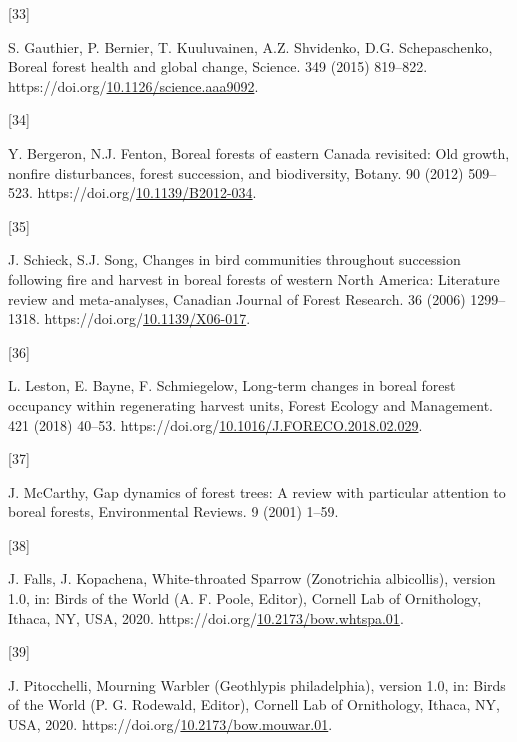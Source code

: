 \documentclass[manuscript, 3p, authoryear]{elsarticle} %
\newlength{\cslhangindent}
\newlength{\csllabelwidth}
\newlength{\cslentryspacingunit} %
\newenvironment{CSLReferences}[2] %
 {%
  \setlength{\parindent}{0pt}
  \ifodd #1
  \let\oldpar\par
  \def\par{\hangindent=\cslhangindent\oldpar}
  \fi
  \setlength{\parskip}{#2\cslentryspacingunit}
 }%
 {}
\newcommand{\CSLLeftMargin}[1]{\parbox[t]{\csllabelwidth}{#1}}
\newcommand{\CSLRightInline}[1]{\parbox[t]{\linewidth - \csllabelwidth}{#1}\break}
\begin{document}
\begin{CSLReferences}{0}{0}
\leavevmode{}%
\CSLLeftMargin{{[}33{]} }%
\CSLRightInline{S. Gauthier, P. Bernier, T. Kuuluvainen, A.Z. Shvidenko, D.G. Schepaschenko, Boreal forest health and global change, Science. 349 (2015) 819--822. https://doi.org/\href{https://doi.org/10.1126/science.aaa9092}{10.1126/science.aaa9092}.}

\leavevmode{}%
\CSLLeftMargin{{[}34{]} }%
\CSLRightInline{Y. Bergeron, N.J. Fenton, Boreal forests of eastern {Canada} revisited: {Old} growth, nonfire disturbances, forest succession, and biodiversity, Botany. 90 (2012) 509--523. https://doi.org/\href{https://doi.org/10.1139/B2012-034}{10.1139/B2012-034}.}

\leavevmode{}%
\CSLLeftMargin{{[}35{]} }%
\CSLRightInline{J. Schieck, S.J. Song, Changes in bird communities throughout succession following fire and harvest in boreal forests of western {North America}: {Literature} review and meta-analyses, Canadian Journal of Forest Research. 36 (2006) 1299--1318. https://doi.org/\href{https://doi.org/10.1139/X06-017}{10.1139/X06-017}.}

\leavevmode{}%
\CSLLeftMargin{{[}36{]} }%
\CSLRightInline{L. Leston, E. Bayne, F. Schmiegelow, Long-term changes in boreal forest occupancy within regenerating harvest units, Forest Ecology and Management. 421 (2018) 40--53. https://doi.org/\href{https://doi.org/10.1016/J.FORECO.2018.02.029}{10.1016/J.FORECO.2018.02.029}.}

\leavevmode{}%
\CSLLeftMargin{{[}37{]} }%
\CSLRightInline{J. McCarthy, Gap dynamics of forest trees: A review with particular attention to boreal forests, Environmental Reviews. 9 (2001) 1--59.}

\leavevmode{}%
\CSLLeftMargin{{[}38{]} }%
\CSLRightInline{J. Falls, J. Kopachena, White-throated {Sparrow} ({Zonotrichia} albicollis), version 1.0, in: Birds of the {World} ({A}. {F}. {Poole}, {Editor}), {Cornell Lab of Ornithology}, {Ithaca, NY, USA}, 2020. https://doi.org/\href{https://doi.org/10.2173/bow.whtspa.01}{10.2173/bow.whtspa.01}.}

\leavevmode{}%
\CSLLeftMargin{{[}39{]} }%
\CSLRightInline{J. Pitocchelli, Mourning {Warbler} ({Geothlypis} philadelphia), version 1.0, in: Birds of the {World} ({P}. {G}. {Rodewald}, {Editor}), {Cornell Lab of Ornithology}, {Ithaca, NY, USA}, 2020. https://doi.org/\href{https://doi.org/10.2173/bow.mouwar.01}{10.2173/bow.mouwar.01}.}


\end{CSLReferences}
\end{document}

